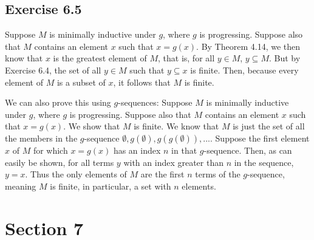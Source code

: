 \documentclass{article}
\theoremstyle{definition}
\begin{document}
\subsection*{Exercise 6.5}
Suppose $M$ is minimally inductive under $g$, where $g$ is progressing. Suppose also that $M$ contains an element $x$ such that $x=g(x)$. By Theorem 4.14, we then know that 
$x$ is the greatest element of $M$, that is, for all $y\in M$, $y\subseteq M$. But by Exercise 6.4, the set of all $y\in M$ such that $y\subseteq x$ is 
finite. Then, because every element of $M$ is a subset of $x$, it follows that $M$ is finite.

We can also prove this using $g$-sequences: 
Suppose $M$ is minimally inductive under $g$, where $g$ is progressing. Suppose also that $M$ contains an element $x$ such that $x=g(x)$. We show that $M$ is finite. We know
that $M$ is just the set of all the members in the $g$-sequence $\emptyset,g(\emptyset),g(g(\emptyset)),...$. Suppose the first element $x$ of $M$ for which $x=g(x)$ has 
an index $n$ in that $g$-sequence. Then, as can easily be shown, for all terms $y$ with an index greater than $n$ in the sequence, $y=x$. Thus the only elements of $M$ 
are the first $n$ terms of the $g$-sequence, meaning $M$ is finite, in particular, a set with $n$ elements.

\section*{Section 7}
\end{document}
